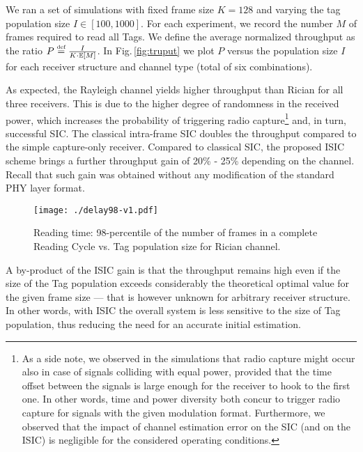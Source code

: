 \documentclass[12pt,draftcls,onecolumn]{IEEEtran}
\newcommand{\eqdef}{ \stackrel{\textrm{\tiny def}}{=}}
\begin{document}
We ran a set of simulations with fixed frame size $K=128$ and varying the tag population size $I \in [100,1000]$. For each experiment, we record the number $M$ of frames required to read all Tags. We define the average normalized throughput as the ratio $P \eqdef \frac{I}{K \cdot \mathbb{E}[{M}]}$. In Fig.\,\ref{fig:truput} we plot $P$ versus the population size $I$ for each receiver structure and channel type (total of six combinations).








As expected, the Rayleigh channel yields higher throughput than Rician for all three receivers.
This is due to the higher degree of  randomness in the received power,  which increases the probability of triggering radio capture\footnote{As a side note, we observed in the simulations that radio capture might occur also in case of signals colliding with equal power, provided that the time offset between the signals is large enough for the receiver to hook to the first one. In other words, time and power diversity both concur to trigger radio capture for signals with the given modulation format. {Furthermore,  we observed that the impact of channel estimation error on the SIC (and on the ISIC) is negligible for the considered operating conditions.}} and, in turn, successful  SIC.
The classical intra-frame SIC doubles the throughput compared to the simple capture-only receiver.
Compared to classical SIC, the proposed ISIC scheme brings a further throughput gain of 20\% - 25\% depending on the channel. Recall that such gain was obtained without any modification of the standard PHY layer format.

 \begin{figure}[tb]
\centering
\texttt{[image: ./delay98-v1.pdf]}

\caption{Reading time: 98-percentile of the number of frames in a complete Reading Cycle vs. Tag population size for Rician channel. }
\label{fig:delay}
\end{figure}


A by-product of the ISIC gain is that the throughput remains high even if the size of the Tag population exceeds considerably the theoretical optimal value for the given frame size --- that is however unknown for arbitrary receiver structure. In other words, with ISIC the overall system is less sensitive to the size of Tag population, thus reducing the need for an accurate initial estimation.
\end{document}
